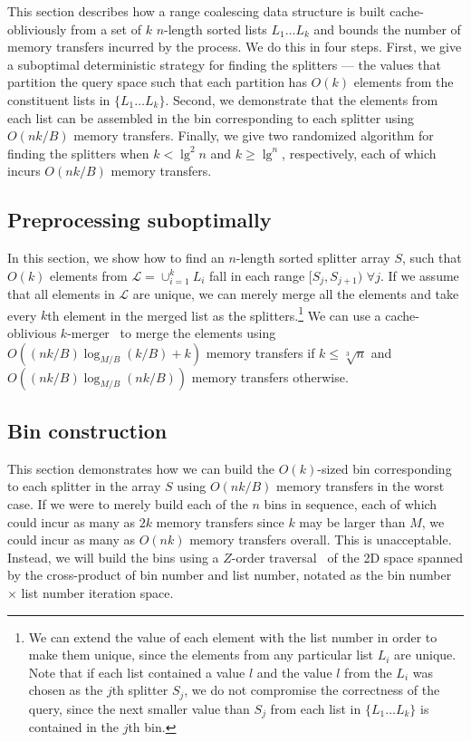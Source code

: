 
This section describes how a range coalescing data structure is built cache-obliviously
from a set of $k$ $n$-length sorted lists $L_1 \ldots L_k$ and bounds
the number of memory transfers incurred by the process.  We do this in four steps.
First, we give a suboptimal deterministic strategy for finding the splitters 
--- the values that partition the query space such that each partition has $O(k)$ 
elements from the constituent lists in $\{ L_1 \ldots L_k \}$.  Second, we 
demonstrate that the elements from each list can be assembled in the bin corresponding
to each splitter using $O(nk / B)$ memory transfers.  Finally, we give two randomized
algorithm for finding the splitters when $k < \lg^2 n$ and $k \geq \lg^ n$, 
respectively, each of which incurs $O(nk/B)$ memory transfers.  

\subsection*{Preprocessing suboptimally}

In this section, we show how to find an $n$-length sorted splitter array $S$, such that $O(k)$
elements from $\mathcal{L} = \cup_{i=1}^{k}L_i$ fall in each range 
$[S_j,S_{j+1})$ $\forall j$.  If we assume that all elements in $\mathcal{L}$ are 
unique, we can merely merge all the elements and take every $k$th element in the
merged list as the splitters.\footnote{We can extend the value of each element with the
list number in order to make them unique, since the elements from any particular
list $L_i$ are unique.  Note that if each list contained a value $l$ and the
value $l$ from
the $L_i$ was chosen as the $j$th splitter $S_j$, we do not compromise the correctness of the 
query, since the next smaller value than $S_j$ from each list in $\{ L_1 \ldots L_k\}$ is 
contained in the $j$th bin.} We can use a cache-oblivious 
$k$-merger~\cite{FrigoLePr99} to merge the elements using 
$O((nk/B) \log_{M/B} (k/B) + k)$ memory transfers if $k \leq \sqrt[3]{n}$ and
$O((nk/B) \log_{M/B} (nk/B))$ memory transfers otherwise.



\subsection*{Bin construction}

This section demonstrates how we can build the $O(k)$-sized bin corresponding to each splitter
in the array $S$ using $O(nk/B)$ memory transfers in the worst case.
If we were to merely build each of the $n$ bins in sequence, each of which could
incur as many as $2k$ memory transfers since $k$ may be larger than $M$, we could
incur as many as $O(nk)$ memory transfers overall.  This is unacceptable.  
Instead, we will build the bins using a $Z$-order traversal~\cite{Morton66} of 
the 2D space spanned by the cross-product of bin number and list number, notated
as the bin number $\times$ list number iteration space.

